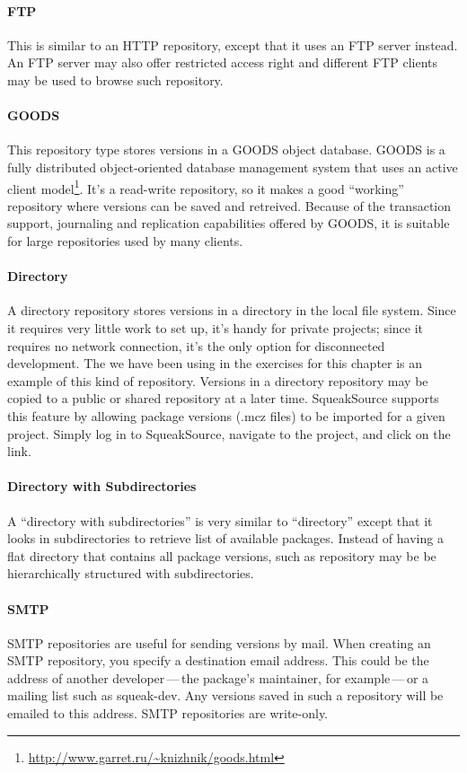 \documentclass[a4paper,10pt,twoside]{book}
\begin{document}
\paragraph{FTP} This is similar to an HTTP repository, except that it uses an FTP server instead. An FTP server may also offer restricted access right and different FTP clients may be used to browse such \MC repository.

\paragraph{GOODS}
This repository type stores versions in a GOODS object database.
GOODS is a fully distributed object-oriented database management system that uses an active client model\footnote{\url{http://www.garret.ru/~knizhnik/goods.html}}.
It's a read-write repository, so it makes a good ``working'' repository where versions can be saved and retreived. Because of the transaction support, journaling and replication capabilities offered by GOODS, it is suitable for large repositories used by many clients.  

\paragraph{Directory} A directory repository stores versions in a directory in the local file system. Since it requires very little work to set up, it's handy for private projects; since it requires no network connection, it's the only option for disconnected development. The  we have been using in the exercises for this chapter is an example of this kind of repository. Versions in a directory repository may be copied to a public or shared repository at a later time. SqueakSource supports this feature by allowing package versions (.mcz files) to be imported for a given project. Simply log in to SqueakSource, navigate to the project, and click on the  link.

\paragraph{Directory with Subdirectories}  A ``directory with subdirectories'' is very similar to ``directory'' except that it looks in subdirectories to retrieve list of available packages. Instead of having a flat directory that contains all package versions, such as repository may be be hierarchically  structured with  subdirectories.

\paragraph{SMTP} SMTP repositories are useful for sending versions by mail. When creating an SMTP repository, you specify a destination email address. This could be the address of another developer\,---\,the package's maintainer, for example\,---\,or a mailing list such as squeak-dev. Any versions saved in such a repository will be emailed to this address.  SMTP repositories are write-only.
\end{document}
